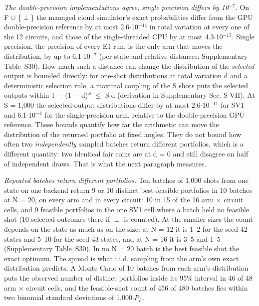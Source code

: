 \documentclass{ieeeaccess}
\begin{document}
\textit{The double-precision implementations agree; single precision differs by 10$^{-7}$.} On F $\cup$ \{$\perp$\} the managed cloud simulator's exact probabilities differ from the GPU double-precision reference by at most 2.6$\cdot$10$^{-14}$ in total variation at every one of the 12 circuits, and those of the single-threaded CPU by at most 4.3$\cdot$10$^{-15}$. Single precision, the precision of every E1 run, is the only arm that moves the distribution, by up to 6.1$\cdot$10$^{-7}$ (per-state and relative distances: Supplementary Table~S30). How much such a distance can change the distribution of the \textit{selected} output is bounded directly: for one-shot distributions at total variation d and a deterministic selection rule, a maximal coupling of the S shots puts the selected outputs within 1 $-$ (1 $-$ d)$^{S}$ $\leq$ S$\cdot$d (derivation in Supplementary Sec. S-VII). At S = 1,000 the selected-output distributions differ by at most 2.6$\cdot$10$^{-11}$ for SV1 and 6.1$\cdot$10$^{-4}$ for the single-precision arm, relative to the double-precision GPU reference. These bounds quantify how far the arithmetic can move the distribution of the returned portfolio at fixed angles. They do not bound how often two \textit{independently} sampled batches return different portfolios, which is a different quantity: two identical fair coins are at d = 0 and still disagree on half of independent draws. That is what the next paragraph measures.


\textit{Repeated batches return different portfolios.} Ten batches of 1,000 shots from one state on one backend return 9 or 10 distinct best-feasible portfolios in 10 batches at N = 20, on every arm and in every circuit: 10 in 15 of the 16 arm $\times$ circuit cells, and 9 feasible portfolios in the one SV1 cell where a batch held no feasible shot (10 selected outcomes there if $\perp$ is counted). At the smaller sizes the count depends on the state as much as on the size: at N = 12 it is 1--2 for the seed-42 states and 5--10 for the seed-43 states, and at N = 16 it is 3--5 and 1--5 (Supplementary Table~S30). In no N = 20 batch is the best feasible shot the exact optimum. The spread is what i.i.d. sampling from the arm's own exact distribution predicts. A Monte Carlo of 10 batches from each arm's distribution puts the observed number of distinct portfolios inside its 95\% interval in 46 of 48 arm $\times$ circuit cells, and the feasible-shot count of 456 of 480 batches lies within two binomial standard deviations of 1,000$\cdot$$P_{F}$.
\end{document}
